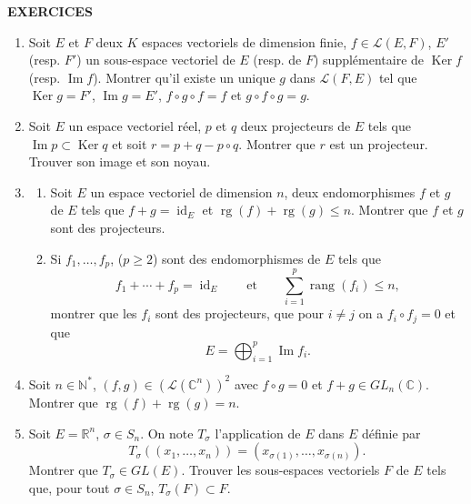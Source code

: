 
\begin{center}
{\Large\sffamily\bfseries\color{BellaLavenderDeep} EXERCICES}
\end{center}
\vspace{0.8em}

\begin{enumerate}[label=\arabic*.,leftmargin=2.2em,itemsep=1.1em]

\item Soit $E$ et $F$ deux $K$ espaces vectoriels de dimension finie, $f\in\mathcal L(E,F)$, $E'$ (resp. $F'$) un sous-espace vectoriel de $E$ (resp. de $F$) supplémentaire de $\operatorname{Ker} f$ (resp. $\operatorname{Im}f$). Montrer qu'il existe un unique $g$ dans $\mathcal L(F,E)$ tel que $\operatorname{Ker} g=F'$, $\operatorname{Im}g=E'$, $f\circ g\circ f=f$ et $g\circ f\circ g=g$.

\item Soit $E$ un espace vectoriel réel, $p$ et $q$ deux projecteurs de $E$ tels que $\operatorname{Im}p\subset\operatorname{Ker} q$ et soit $r=p+q-p\circ q$. Montrer que $r$ est un projecteur. Trouver son image et son noyau.

\item
\begin{enumerate}[label=\alph*),leftmargin=2em]
\item Soit $E$ un espace vectoriel de dimension $n$, deux endomorphismes $f$ et $g$ de $E$ tels que $f+g=\operatorname{id}_E$ et $\operatorname{rg}(f)+\operatorname{rg}(g)\le n$. Montrer que $f$ et $g$ sont des projecteurs.
\item Si $f_1,\ldots,f_p$, ($p\ge2$) sont des endomorphismes de $E$ tels que
\[
f_1+\cdots+f_p=\operatorname{id}_E
\qquad\text{et}\qquad
\sum_{i=1}^p\operatorname{rang}(f_i)\le n,
\]
montrer que les $f_i$ sont des projecteurs, que pour $i\ne j$ on a $f_i\circ f_j=0$ et que
\[
E=\bigoplus_{i=1}^p\operatorname{Im}f_i.
\]
\end{enumerate}

\item Soit $n\in\mathbb N^*$, $(f,g)\in(\mathcal L(\mathbb C^n))^2$ avec $f\circ g=0$ et $f+g\in GL_n(\mathbb C)$. Montrer que $\operatorname{rg}(f)+\operatorname{rg}(g)=n$.

\item Soit $E=\mathbb R^n$, $\sigma\in S_n$. On note $T_\sigma$ l'application de $E$ dans $E$ définie par
\[
T_\sigma((x_1,\ldots,x_n))=(x_{\sigma(1)},\ldots,x_{\sigma(n)}).
\]
Montrer que $T_\sigma\in GL(E)$. Trouver les sous-espaces vectoriels $F$ de $E$ tels que, pour tout $\sigma\in S_n$, $T_\sigma(F)\subset F$.


\end{enumerate}

